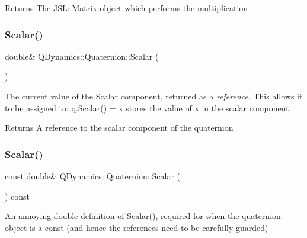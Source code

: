 \begin{DoxyReturn}{Returns}
The \hyperlink{classJSL_1_1Matrix}{J\+S\+L\+::\+Matrix} object which performs the multiplication 
\end{DoxyReturn}
\mbox{\label{classQDynamics_1_1Quaternion_a8121c47a579baffb9e692b8cd2c7dee7}} 
\subsubsection{\texorpdfstring{Scalar()}{Scalar()}\hspace{0.1cm}{\footnotesize\ttfamily [1/2]}}
{\footnotesize\ttfamily double\& Q\+Dynamics\+::\+Quaternion\+::\+Scalar (\begin{DoxyParamCaption}{ }\end{DoxyParamCaption})\hspace{0.3cm}{\ttfamily [inline]}}



The current value of the Scalar component, returned as a {\itshape reference}. This allows it to be assigned to\+: q.\+Scalar() = x stores the value of x in the scalar component. 

\begin{DoxyReturn}{Returns}
A reference to the scalar component of the quaternion 
\end{DoxyReturn}
\mbox{\label{classQDynamics_1_1Quaternion_a1bc0af90c699e7c2eba94833ae7fb105}} 
\subsubsection{\texorpdfstring{Scalar()}{Scalar()}\hspace{0.1cm}{\footnotesize\ttfamily [2/2]}}
{\footnotesize\ttfamily const double\& Q\+Dynamics\+::\+Quaternion\+::\+Scalar (\begin{DoxyParamCaption}{ }\end{DoxyParamCaption}) const\hspace{0.3cm}{\ttfamily [inline]}}



An annoying double-\/definition of \hyperlink{classQDynamics_1_1Quaternion_a8121c47a579baffb9e692b8cd2c7dee7}{Scalar()}, required for when the quaternion object is a const (and hence the references need to be carefully guarded) 

